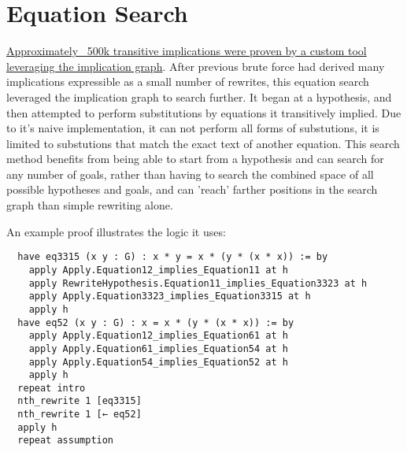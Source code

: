 \chapter{Equation Search}

\href{https://github.com/teorth/equational_theories/tree/main/equational_theories/Generated/EquationSearch}{Approximately ~500k transitive implications were proven by a custom tool leveraging the implication graph}. After previous brute force had derived many implications expressible as a small number of rewrites, this equation search leveraged the implication graph to search further. It began at a hypothesis, and then attempted to perform substitutions by equations it transitively implied. Due to it's naive implementation, it can not perform all forms of substutions, it is limited to substutions that match the exact text of another equation. This search method benefits from being able to start from a hypothesis and can search for any number of goals, rather than having to search the combined space of all possible hypotheses and goals, and can 'reach' farther positions in the search graph than simple rewriting alone.

An example proof illustrates the logic it uses:

\begin{verbatim}
  have eq3315 (x y : G) : x * y = x * (y * (x * x)) := by
    apply Apply.Equation12_implies_Equation11 at h
    apply RewriteHypothesis.Equation11_implies_Equation3323 at h
    apply Apply.Equation3323_implies_Equation3315 at h
    apply h
  have eq52 (x y : G) : x = x * (y * (x * x)) := by
    apply Apply.Equation12_implies_Equation61 at h
    apply Apply.Equation61_implies_Equation54 at h
    apply Apply.Equation54_implies_Equation52 at h
    apply h
  repeat intro
  nth_rewrite 1 [eq3315]
  nth_rewrite 1 [← eq52]
  apply h
  repeat assumption
\end{verbatim}
